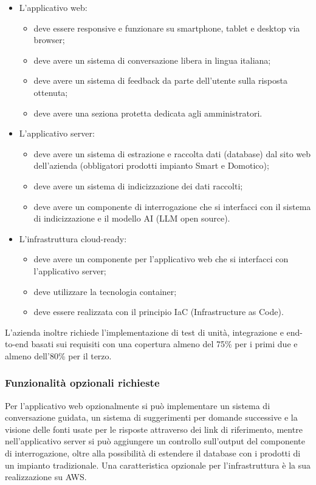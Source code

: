 \documentclass[10pt]{article}
\begin{document}
\begin{itemize} 
    \item L’applicativo web: 
    \begin{itemize}
        \item deve essere responsive e funzionare su smartphone, tablet e desktop via browser;
        \item deve avere un sistema di conversazione libera in lingua italiana;
        \item deve avere un sistema di feedback da parte dell’utente sulla risposta ottenuta;
        \item deve avere una seziona protetta dedicata agli amministratori.
    \end{itemize}
    \item L’applicativo server: 
    \begin{itemize}
        \item deve avere un sistema di estrazione e raccolta dati (database) dal sito web dell’azienda (obbligatori prodotti impianto Smart e Domotico);
        \item deve avere un sistema di indicizzazione dei dati raccolti;
        \item deve avere un componente di interrogazione che si interfacci con il sistema di indicizzazione e il modello AI (LLM open source).
    \end{itemize}
    \item L’infrastruttura cloud-ready: 
    \begin{itemize}
        \item deve avere un componente per l’applicativo web che si interfacci con l’applicativo server;
        \item deve utilizzare la tecnologia container;
        \item deve essere realizzata con il principio IaC (Infrastructure as Code).
    \end{itemize}
\end{itemize}
L’azienda inoltre richiede l’implementazione di test di unità, integrazione e end-to-end basati sui requisiti con una copertura almeno del 75\% per i primi due e almeno dell’80\% per il terzo.
\subsubsection{Funzionalità opzionali richieste}
Per l’applicativo web opzionalmente si può implementare un sistema di conversazione guidata, un sistema di suggerimenti per domande successive e la visione delle fonti usate per le risposte attraverso dei link di riferimento, mentre nell’applicativo server si può aggiungere un controllo sull’output del componente di interrogazione, oltre alla possibilità di estendere il database con i prodotti di un impianto tradizionale.
Una caratteristica opzionale per l’infrastruttura è la sua realizzazione su AWS.
\end{document}

